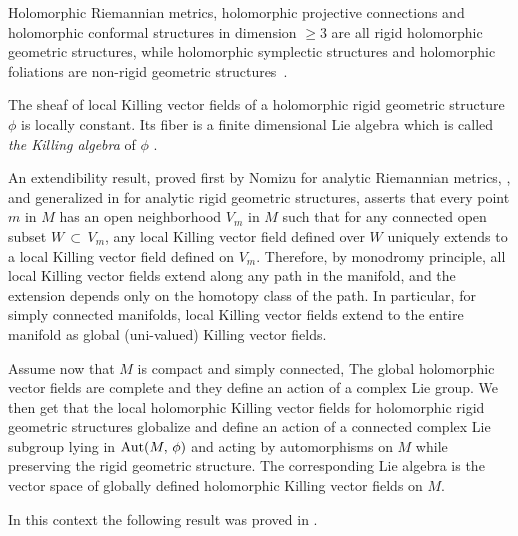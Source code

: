 \documentclass[12pt,reqno]{amsart}
\theoremstyle{definition}
\numberwithin{equation}{section}
\begin{document}
Holomorphic Riemannian metrics, holomorphic projective connections and holomorphic 
conformal structures in dimension $\geq 3$ are all rigid holomorphic geometric structures,
while holomorphic symplectic structures and holomorphic foliations are non-rigid geometric 
structures~\cite{DG}.

The sheaf of local Killing vector fields of a holomorphic rigid geometric structure $\phi$ is 
locally constant. Its fiber is a finite dimensional Lie algebra which is called {\it the 
Killing algebra} of $\phi$ \cite{DG,Gr}.

An extendibility result, proved first by Nomizu for analytic Riemannian metrics, \cite{No}, and generalized 
in \cite{Am, Gr,DG} for analytic rigid geometric structures, asserts that every point $m$ in $M$ has an 
open neighborhood $V_m$ in $M$ such that for any connected open subset $W\,\subset\, V_m$, any local 
Killing vector field defined over $W$ uniquely extends to a local Killing vector field defined on $V_m$. 
Therefore, by monodromy principle, all local Killing vector fields extend along any path in the manifold, 
and the extension depends only on the homotopy class of the path. In particular, for simply connected 
manifolds, local Killing vector fields extend to the entire manifold as global (uni-valued) Killing vector 
fields.

Assume now that $M$ is compact and simply connected, The global holomorphic vector fields are complete and 
they define an action of a complex Lie group. We then get that the local holomorphic Killing vector fields 
for holomorphic rigid geometric structures globalize and define an action of a connected complex Lie 
subgroup lying in ${\rm Aut}(M,\, \phi)$ and acting by automorphisms on $M$ while preserving the rigid 
geometric structure. The corresponding Lie algebra is the vector space of globally defined holomorphic 
Killing vector fields on $M$.

In this context the following result was proved in \cite[Theorem 5.1]{BCDG}.
\end{document}
